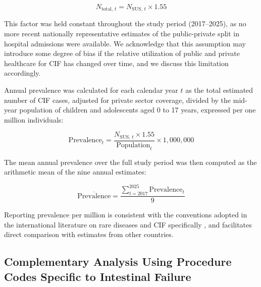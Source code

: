 \documentclass[12pt,a4paper]{article}
\theoremstyle{plain}
\theoremstyle{definition}
\theoremstyle{remark}
\begin{document}
\begin{equation}
    N_{\text{total},\, t} = N_{\text{SUS},\, t} \times 1.55
\end{equation}

This factor was held constant throughout the study period (2017--2025), as no more recent nationally representative estimates of the public-private split in hospital admissions were available. We acknowledge that this assumption may introduce some degree of bias if the relative utilization of public and private healthcare for CIF has changed over time, and we discuss this limitation accordingly.

Annual prevalence was calculated for each calendar year $t$ as the total estimated number of CIF cases, adjusted for private sector coverage, divided by the mid-year population of children and adolescents aged 0 to 17 years, expressed per one million individuals:

\begin{equation}
    \text{Prevalence}_{t} = \frac{N_{\text{SUS},\, t} \times 1.55}{\text{Population}_{t}} \times 1{,}000{,}000
\end{equation}

The mean annual prevalence over the full study period was then computed as the arithmetic mean of the nine annual estimates:

\begin{equation}
    \overline{\text{Prevalence}} = \frac{\displaystyle\sum_{t=2017}^{2025} \text{Prevalence}_{t}}{9}
\end{equation}

Reporting prevalence per million is consistent with the conventions adopted in the international literature on rare diseases and CIF specifically \cite{beath2011trends, antunes2020portuguese, mukhopadhyay2019}, and facilitates direct comparison with estimates from other countries.

\subsection*{Complementary Analysis Using Procedure Codes Specific to Intestinal Failure}
\end{document}
